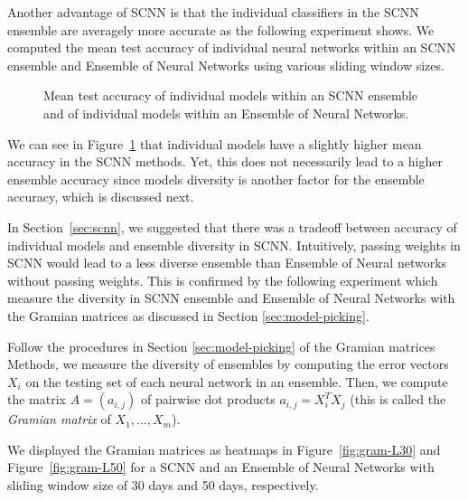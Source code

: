 \documentclass[conference]{IEEEtran}
\begin{document}
		Another advantage of SCNN is that the individual classifiers in the SCNN ensemble are averagely more accurate as the following experiment shows. We computed the mean test accuracy of individual neural networks within an SCNN ensemble and Ensemble of Neural Networks using various sliding window sizes. 
			
		\begin{figure}[H]
			\centering
			\caption{Mean test accuracy of individual models within an SCNN ensemble and of individual models within an Ensemble of Neural Networks.}
			\label{fig:mean-accuracy-individual-models}
		\end{figure}
		
		We can see in Figure~\ref{fig:mean-accuracy-individual-models} that individual models have a slightly higher mean accuracy in the SCNN methods. Yet, this does not necessarily lead to a higher ensemble accuracy since models diversity is another factor for the ensemble accuracy, which is discussed next.
	    
	    In Section~\ref{sec:scnn},  we suggested that there was a tradeoff between accuracy of individual models and ensemble diversity in SCNN. Intuitively, passing weights in SCNN would lead to a less diverse ensemble than Ensemble of Neural networks without passing weights. This is confirmed by the following experiment which measure the diversity in SCNN ensemble and Ensemble of Neural Networks with the Gramian matrices as discussed in Section \ref{sec:model-picking}. 
		
		Follow the procedures in Section \ref{sec:model-picking} of the Gramian matrices Methods, we measure the diversity of ensembles by computing the error vectors $X_i$ on the testing set of each neural network in an ensemble. Then, we compute the matrix $A = (a_{i,j})$ of pairwise dot products $a_{i,j} = X_i^T X_j$ (this is called the \emph{Gramian matrix} of $X_1, \ldots, X_m$).
		
		We displayed the Gramian matrices as heatmaps in Figure~\ref{fig:gram-L30} and Figure~\ref{fig:gram-L50} for a SCNN and an Ensemble of Neural Networks with sliding window size of 30 days and 50 days, respectively. 
		
\end{document}
